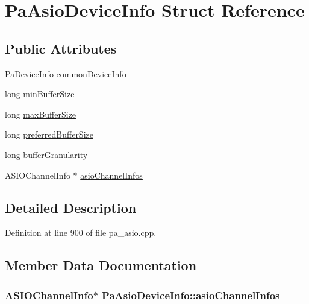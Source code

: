 \hypertarget{struct_pa_asio_device_info}{}\section{Pa\+Asio\+Device\+Info Struct Reference}
\label{struct_pa_asio_device_info}
\subsection*{Public Attributes}
\begin{DoxyCompactItemize}
\item 
\hyperlink{struct_pa_device_info}{Pa\+Device\+Info} \hyperlink{struct_pa_asio_device_info_ab882b243cb06587235f993247b5651e3}{common\+Device\+Info}
\item 
long \hyperlink{struct_pa_asio_device_info_af0ec4ebc44687f7fe847070b01a84a3b}{min\+Buffer\+Size}
\item 
long \hyperlink{struct_pa_asio_device_info_a0cfad93025412e2f380df55321261a4f}{max\+Buffer\+Size}
\item 
long \hyperlink{struct_pa_asio_device_info_a335fb70be1880dbbd6caee196666173a}{preferred\+Buffer\+Size}
\item 
long \hyperlink{struct_pa_asio_device_info_aedeaec8c670140e8c366561eb0f2e39f}{buffer\+Granularity}
\item 
A\+S\+I\+O\+Channel\+Info $\ast$ \hyperlink{struct_pa_asio_device_info_a0179690f17435156798c2d2249a5335f}{asio\+Channel\+Infos}
\end{DoxyCompactItemize}


\subsection{Detailed Description}


Definition at line 900 of file pa\+\_\+asio.\+cpp.



\subsection{Member Data Documentation}
\subsubsection[{\texorpdfstring{asio\+Channel\+Infos}{asioChannelInfos}}]{\setlength{\rightskip}{0pt plus 5cm}A\+S\+I\+O\+Channel\+Info$\ast$ Pa\+Asio\+Device\+Info\+::asio\+Channel\+Infos}\hypertarget{struct_pa_asio_device_info_a0179690f17435156798c2d2249a5335f}{}\label{struct_pa_asio_device_info_a0179690f17435156798c2d2249a5335f}


